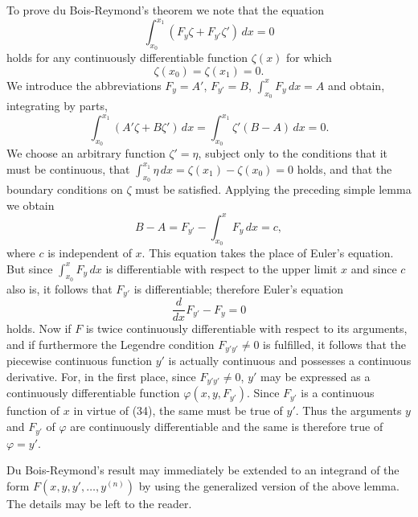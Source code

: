 To prove du Bois-Reymond's theorem we note that the equation
\[
\int_{x_0}^{x_1}(F_y\zeta+F_{y'}\zeta')\,dx=0
\]
holds for any continuously differentiable function $\zeta(x)$ for which
\[
\zeta(x_0)=\zeta(x_1)=0.
\]
We introduce the abbreviations $F_y=A'$, $F_{y'}=B$, $\int_{x_0}^{x}F_y\,dx=A$ and obtain, integrating by parts,
\[
\int_{x_0}^{x_1}(A'\zeta+B\zeta')\,dx
=\int_{x_0}^{x_1}\zeta'(B-A)\,dx=0.
\]
We choose an arbitrary function $\zeta'=\eta$, subject only to the conditions that it must be continuous, that $\int_{x_0}^{x_1}\eta\,dx=\zeta(x_1)-\zeta(x_0)=0$ holds, and that the boundary conditions on $\zeta$ must be satisfied. Applying the preceding simple lemma we obtain
\begin{equation}\tag{34}
B-A=F_{y'}-\int_{x_0}^{x}F_y\,dx=c,
\end{equation}
where $c$ is independent of $x$. This equation takes the place of Euler's equation. But since $\int_{x_0}^{x}F_y\,dx$ is differentiable with respect to the upper limit $x$ and since $c$ also is, it follows that $F_{y'}$ is differentiable; therefore Euler's equation
\begin{equation}\tag{34a}
\frac{d}{dx}F_{y'}-F_y=0
\end{equation}
holds. Now if $F$ is twice continuously differentiable with respect to its arguments, and if furthermore the Legendre condition $F_{y'y'}\ne0$ is fulfilled, it follows that the piecewise continuous function $y'$ is actually continuous and possesses a continuous derivative. For, in the first place, since $F_{y'y'}\ne0$, $y'$ may be expressed as a continuously differentiable function $\varphi(x,y,F_{y'})$. Since $F_{y'}$ is a continuous function of $x$ in virtue of (34), the same must be true of $y'$. Thus the arguments $y$ and $F_{y'}$ of $\varphi$ are continuously differentiable and the same is therefore true of $\varphi=y'$.

Du Bois-Reymond's result may immediately be extended to an integrand of the form $F(x,y,y',\ldots,y^{(n)})$ by using the generalized version of the above lemma. The details may be left to the reader.

